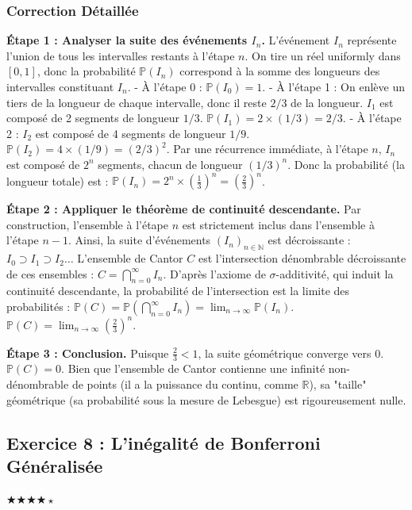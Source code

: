 \documentclass[11pt,a4paper]{article}
\begin{document}
\subsubsection*{Correction Détaillée}

\textbf{Étape 1 : Analyser la suite des événements $I_n$.}
L'événement $I_n$ représente l'union de tous les intervalles restants à l'étape $n$.
On tire un réel uniformly dans $[0, 1]$, donc la probabilité $\mathbb{P}(I_n)$ correspond à la somme des longueurs des intervalles constituant $I_n$.
- À l'étape 0 : $\mathbb{P}(I_0) = 1$.
- À l'étape 1 : On enlève un tiers de la longueur de chaque intervalle, donc il reste $2/3$ de la longueur. $I_1$ est composé de 2 segments de longueur $1/3$. $\mathbb{P}(I_1) = 2 \times (1/3) = 2/3$.
- À l'étape 2 : $I_2$ est composé de 4 segments de longueur $1/9$. $\mathbb{P}(I_2) = 4 \times (1/9) = (2/3)^2$.
Par une récurrence immédiate, à l'étape $n$, $I_n$ est composé de $2^n$ segments, chacun de longueur $(1/3)^n$.
Donc la probabilité (la longueur totale) est :
$\mathbb{P}(I_n) = 2^n \times \left(\frac{1}{3}\right)^n = \left(\frac{2}{3}\right)^n$.

\textbf{Étape 2 : Appliquer le théorème de continuité descendante.}
Par construction, l'ensemble à l'étape $n$ est strictement inclus dans l'ensemble à l'étape $n-1$.
Ainsi, la suite d'événements $(I_n)_{n \in \mathbb{N}}$ est décroissante :
$I_0 \supset I_1 \supset I_2 \dots$
L'ensemble de Cantor $C$ est l'intersection dénombrable décroissante de ces ensembles : $C = \bigcap_{n=0}^\infty I_n$.
D'après l'axiome de $\sigma$-additivité, qui induit la continuité descendante, la probabilité de l'intersection est la limite des probabilités :
$\mathbb{P}(C) = \mathbb{P}\left(\bigcap_{n=0}^\infty I_n\right) = \lim_{n \to \infty} \mathbb{P}(I_n)$.
$\mathbb{P}(C) = \lim_{n \to \infty} \left(\frac{2}{3}\right)^n$.

\textbf{Étape 3 : Conclusion.}
Puisque $\frac{2}{3} < 1$, la suite géométrique converge vers $0$.
$\mathbb{P}(C) = 0$.
Bien que l'ensemble de Cantor contienne une infinité non-dénombrable de points (il a la puissance du continu, comme $\mathbb{R}$), sa "taille" géométrique (sa probabilité sous la mesure de Lebesgue) est rigoureusement nulle.



\subsection*{Exercice 8 : L'inégalité de Bonferroni Généralisée}
$\bigstar\bigstar\bigstar\bigstar\star$
\end{document}
